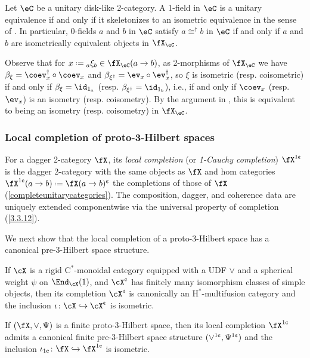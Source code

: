 \documentclass[12pt,reqno]{amsart}
\newcommand{\C}{\eC}
\newcommand{\Cstar}{\ensuremath{\mathrm{C}^{*}}}
\newcommand{\Hstar}{\ensuremath{\mathrm{H}^{*}}}
\newcommand{\defn}[1]{\emph{#1}}
\newcommand{\cent}{\textup{\textcent}}
\renewcommand{\star}{\dag}
\DeclareRobustCommand{\coloneq}{\mathrel{\vcenter{\baselineskip0.5ex\lineskiplimit0pt\hbox{\scriptsize{\upshape.}}\hbox{\scriptsize{\upshape.}}}}=}
\begin{document}
\begin{lemma}
\label{isomequiviff}
Let $\C$ be a unitary disk-like 2-category. A 1-field in $\C$ is a unitary equivalence if and only if it skeletonizes to an isometric equivalence in the sense of \cite[Defn. 4.10]{3Hilb}. In particular, 0-fields $a$ and $b$ in $\C$ satisfy $a\cong^\star b$ in $\C$ if and only if $a$ and $b$ are isometrically equivalent objects in $\fX_\C$.
\end{lemma}

\begin{pf} 
Observe that for $x\coloneq{}_a\xi_b\in\fX_\C(a\to b)$, as 2-morphisms of $\fX_\C$ we have $\beta_\xi = \coev_x^\dag \circ \coev_x$ and $\beta_{\xi^\star} = \ev_x \circ \ev_x^\dag$, so $\xi$ is isometric (resp. coisometric) if and only if $\beta_\xi = \id_{1_a}$ (resp. $\beta_{\xi^\star} = \id_{1_b}$), i.e., if and only if $\coev_x$ (resp. $\ev_x$) is an isometry (resp. coisometry). By the argument in \cite[Rmk. 4.12]{3Hilb}, this is equivalent to being an isometry (resp. coisometry) in $\fX_\C$.
\end{pf}

\subsubsection{Local completion of proto-3-Hilbert spaces}
\label{localcomp}
For a dagger 2-category $\fX$, its \defn{local completion} (or \defn{1-Cauchy completion}) $\fX^{1\cent}$ is the dagger 2-category with the same objects as $\fX$ and hom categories $\fX^{1\cent}(a\to b)\coloneq\fX(a\to b)^\cent$ the completions of those of $\fX$ (\cref{completeunitarycategories}). The composition, dagger, and coherence data are uniquely extended componentwise via the universal property of completion (\cref{3.3.12}). 

We next show that the local completion of a proto-3-Hilbert space has a canonical pre-3-Hilbert space structure.

\begin{lemma}
  \label{cstr:local-cauchy-3hilb}
  \begin{lst}
    \item[(a)]\label{lcc1} If $\cX$ is a 
    rigid 
    $\Cstar$-monoidal category equipped with a UDF $\vee$ and a spherical weight $\psi$ on $\End_\cX(1)$, and $\cX^\cent$ has finitely many isomorphism classes of simple objects, then its completion $\cX^\cent$ is canonically an $\Hstar$-multifusion category and the inclusion
    $\iota\colon\cX\hookrightarrow\cX^\cent$ is isometric.
    \item[(b)]\label{lcc2} If $(\fX,\vee,\Psi)$ is a finite proto-3-Hilbert space, then its local completion $\fX^{1\cent}$ admits a canonical finite pre-3-Hilbert space structure $(\vee^{1\cent},\Psi^{1\cent})$ and the inclusion $\iota_{1\cent}\colon\fX\hookrightarrow\fX^{1\cent}$ is isometric.
  \end{lst}
\end{lemma}
\end{document}
